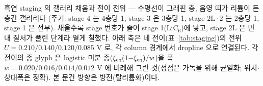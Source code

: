 \caption{흑연 staging 의 갤러리 채움과 전이 전위 --- 수평선이 그래핀 층, 음영 띠가 리튬이 든 층간 갤러리다
(주기: stage 4 는 4층당 1, stage 3 은 3층당 1, stage $2\mathrm L\!\cdot\!2$ 는 2층당 1, stage 1 은 전부).
채울수록 stage 번호가 줄어 stage 1($\mathrm{LiC_6}$)에 닿고, stage $2\mathrm L$ 은 면내 질서가 풀린 단계라 옅게 칠했다.
아래 축은 네 전이(표~\ref{tab:staging})의 전위 $U{=}0.210/0.140/0.120/0.085$ V 로, 각 column 경계에서 dropline 으로
연결된다. 각 전이의 종 glyph 은 logistic 미분 종($\xi_\eq(1{-}\xi_\eq)/w$)을 폭 $w{=}0.020/0.016/0.014/0.012$ V 에 비례해
그린 것(정점은 가독을 위해 균일화; 위치$\cdot$상대폭은 정확). 본 문건 방향은 방전(탈리튬화)이다.}
\label{fig:staging}
